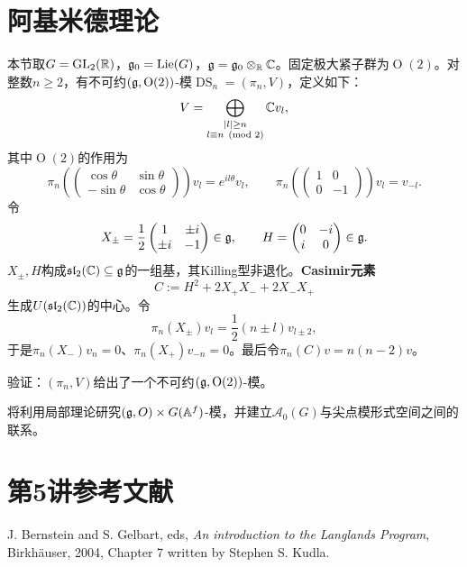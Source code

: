 \section{阿基米德理论}\label{L5S4}
本节取$G=\operatorname{GL}_2(\mathbb{R})$，$\mathfrak{g}_0=\operatorname{Lie}(G)$，$\mathfrak{g}=\mathfrak{g}_0\otimes_{\mathbb{R}}\mathbb{C}$。固定极大紧子群为$\operatorname O(2)$。对整数$n\geq2$，有不可约$(\mathfrak{g},\operatorname O(2))$-模$\operatorname{DS}_n=(\pi_n,V)$，定义如下：
\[V=\bigoplus_{\substack{|l|\geq n\\l\equiv n\pmod2}}\mathbb{C} v_l,\]
其中$\operatorname O(2)$的作用为
\[\pi_n\!\left(\begin{pmatrix}\cos\theta&\sin\theta\\-\sin\theta&\cos\theta\end{pmatrix}\right)v_l=e^{il\theta}v_l,\qquad\pi_n\!\left(\begin{pmatrix}1&0\\0&-1\end{pmatrix}\right)v_l=v_{-l}.\]
令
\[X_\pm=\frac12\begin{pmatrix}1&\pm i\\\pm i&-1\end{pmatrix}\in\mathfrak{g},\qquad H=\begin{pmatrix}0&-i\\i&0\end{pmatrix}\in\mathfrak{g}.\]
$X_\pm,H$构成$\mathfrak{sl}_2(\mathbb{C})\subseteq\mathfrak{g}$的一组基，其Killing型非退化。\textbf{Casimir元素}
\[C:=H^2+2X_+X_-+2X_-X_+\]
生成$U(\mathfrak{sl}_2(\mathbb{C}))$的中心。令
\[\pi_n(X_\pm)v_l=\frac12(n\pm l)v_{l\pm2},\]
于是$\pi_n(X_-)v_n=0$、$\pi_n(X_+)v_{-n}=0$。最后令$\pi_n(C)v=n(n-2)v$。
\begin{exercise*}\label{L5S4EX}
验证：$(\pi_n,V)$给出了一个不可约$(\mathfrak{g},\operatorname O(2))$-模。
\end{exercise*}
将利用局部理论研究$(\mathfrak{g},O)\times G(\mathbb{A}^f)$-模，并建立$\mathcal A_0(G)$与尖点模形式空间之间的联系。
\section{第5讲参考文献}\label{L5S5}
\begin{references} J. Bernstein and S. Gelbart, eds, \textit{An introduction to the Langlands Program}, Birkh\"auser, 2004, Chapter 7 written by Stephen S. Kudla.\end{references}
